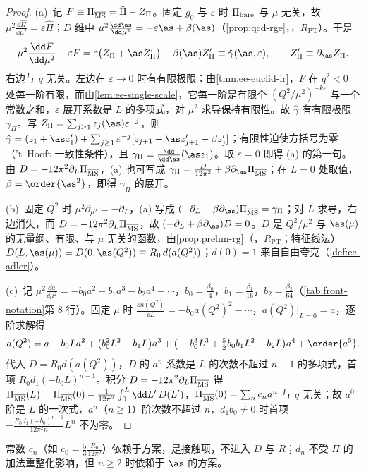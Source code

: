 \begin{proof}
(a)~记 $F\equiv\Pi_{\overline{\rm MS}}=\hat\Pi-Z_\Pi$。固定 $g_0$ 与 $\varepsilon$ 时 $\Pi_{\rm bare}$ 与 $\mu$ 无关，故 $\mu^2\frac{\dd\hat\Pi}{\dd\mu^2}=\varepsilon\hat\Pi$；$D$ 维中 $\mu^2\frac{\dd\as}{\dd\mu^2}=-\varepsilon\as+\beta(\as)$（\cref{prop:qcd-rge}，\tagR，$R_{\mathrm{PT}}$）。于是
\begin{equation}\label{eq:ee-rge-eps}
\mu^2\frac{\dd F}{\dd\mu^2}-\varepsilon F=\varepsilon\big(Z_\Pi+\as Z_\Pi'\big)-\beta(\as)Z_\Pi'\equiv\hat\gamma(\as,\varepsilon),\qquad Z_\Pi'\equiv\partial_{\as}Z_\Pi .
\end{equation}
右边与 $q$ 无关。左边在 $\varepsilon\to0$ 时有有限极限：由\cref{thm:ee-euclid-ir}，$F$ 在 $q^2<0$ 处每一阶有限，而由\cref{lem:ee-single-scale}，它每一阶是有限个 $(Q^2/\mu^2)^{-k\varepsilon}$ 与一个常数之和，$\varepsilon$ 展开系数是 $L$ 的多项式，对 $\mu^2$ 求导保持有限性。故 $\hat\gamma$ 有有限极限 $\gamma_\Pi$。写 $Z_\Pi=\sum_{j\ge1}z_j(\as)\varepsilon^{-j}$，则 $\hat\gamma=(z_1+\as z_1')+\sum_{j\ge1}\varepsilon^{-j}[z_{j+1}+\as z_{j+1}'-\beta z_j']$；有限性迫使方括号为零（'t~Hooft 一致性条件），且 $\gamma_\Pi=\frac{\dd}{\dd\as}(\as z_1)$。取 $\varepsilon=0$ 即得 (a) 的第一句。由 $D=-12\pi^2\partial_L\Pi_{\overline{\rm MS}}$，(a) 也可写成 $\gamma_\Pi=\frac{D}{12\pi^2}+\beta\partial_{\as}\Pi_{\overline{\rm MS}}$；在 $L=0$ 处取值，$\beta=\order{\as^2}$，即得 $\gamma_\Pi$ 的展开。

(b)~固定 $Q^2$ 时 $\mu^2\partial_{\mu^2}=-\partial_L$，(a) 写成 $(-\partial_L+\beta\partial_{\as})\Pi_{\overline{\rm MS}}=\gamma_\Pi$；对 $L$ 求导，右边消失，而 $D=-12\pi^2\partial_L\Pi_{\overline{\rm MS}}$，故 $(-\partial_L+\beta\partial_{\as})D=0$。$D$ 是 $Q^2/\mu^2$ 与 $\as(\mu)$ 的无量纲、有限、与 $\mu$ 无关的函数，由\cref{prop:prelim-rg}（\tagR，$R_{\mathrm{PT}}$；特征线法）$D(L,\as(\mu))=D(0,\as(Q^2))\equiv R_0\,d(a(Q^2))$；$d(0)=1$ 来自自由夸克（\cref{def:ee-adler}）。

(c)~记 $\mu^2\frac{\dd a}{\dd\mu^2}=-b_0a^2-b_1a^3-b_2a^4-\cdots$，$b_0=\frac{\beta_0}4$，$b_1=\frac{\beta_1}{16}$，$b_2=\frac{\beta_2}{64}$（\cref{tab:front-notation}第 8 行）。固定 $\mu$ 时 $\frac{\dd a(Q^2)}{\dd L}=-b_0a(Q^2)^2-\cdots$，$a(Q^2)|_{L=0}=a$，逐阶求解得
\begin{equation}\label{eq:ee-arun}
a(Q^2)=a-b_0La^2+\big(b_0^2L^2-b_1L\big)a^3+\big(-b_0^3L^3+\tfrac52b_0b_1L^2-b_2L\big)a^4+\order{a^5}.
\end{equation}
代入 $D=R_0d(a(Q^2))$，$D$ 的 $a^n$ 系数是 $L$ 的次数不超过 $n-1$ 的多项式，首项 $R_0d_1(-b_0L)^{n-1}$。积分 $D=-12\pi^2\partial_L\Pi_{\overline{\rm MS}}$ 得 $\Pi_{\overline{\rm MS}}(L)=\Pi_{\overline{\rm MS}}(0)-\frac1{12\pi^2}\int_0^L\dd L'\,D(L')$，$\Pi_{\overline{\rm MS}}(0)=\sum_nc_na^n$ 与 $q$ 无关；故 $a^0$ 阶是 $L$ 的一次式，$a^n$（$n\ge1$）阶次数不超过 $n$，$d_1b_0\ne0$ 时首项 $-\frac{R_0d_1(-b_0)^{n-1}}{12\pi^2n}L^n$ 不为零。
\end{proof}
常数 $c_n$（如 $c_0=\frac53\frac{R_0}{12\pi^2}$）依赖于方案，是接触项，不进入 $D$ 与 $R$；$d_n$ 不受 $\Pi$ 的加法重整化影响，但 $n\ge2$ 时依赖于 $\as$ 的方案。

